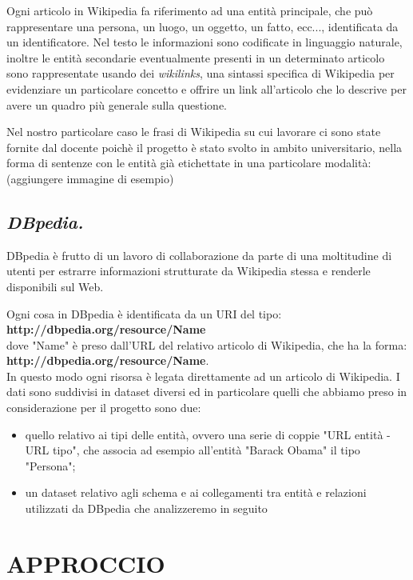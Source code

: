 \documentclass[10pt,a4paper,twocolumn]{article}
\begin{document}
Ogni articolo in Wikipedia fa riferimento ad una entità principale, che può rappresentare una persona, un luogo, un oggetto, un fatto, ecc..., identificata da un identificatore. Nel testo le informazioni sono codificate in linguaggio naturale, inoltre le entità secondarie eventualmente presenti in un determinato articolo sono rappresentate usando dei \textit{wikilinks}, una sintassi specifica di Wikipedia per evidenziare un particolare concetto e offrire un link all'articolo che lo descrive per avere un quadro più generale sulla questione.

Nel nostro particolare caso le frasi di Wikipedia su cui lavorare ci sono state fornite dal docente poichè il progetto è stato svolto in ambito universitario, nella forma di sentenze con le entità già etichettate in una particolare modalità:\\

(aggiungere immagine di esempio)

\subsection*{\textit{DBpedia.}}

DBpedia è frutto di un lavoro di collaborazione da parte di una moltitudine di utenti per estrarre informazioni strutturate da Wikipedia stessa e renderle disponibili sul Web.

Ogni cosa in DBpedia è identificata da un URI del tipo:\\\textbf{http://dbpedia.org/resource/Name}\\ dove "Name" è preso dall'URL del relativo articolo di Wikipedia, che ha la forma:\\\textbf{http://dbpedia.org/resource/Name}.\\
In questo modo ogni risorsa è legata direttamente ad un articolo di Wikipedia. I dati sono suddivisi in dataset diversi ed in particolare quelli che abbiamo preso in considerazione per il progetto sono due:
\begin{itemize}
\item quello relativo ai tipi delle entità, ovvero una serie di coppie "URL entità - URL tipo", che associa ad esempio all'entità "Barack Obama" il tipo "Persona";
\item un dataset relativo agli schema e ai collegamenti tra entità e relazioni utilizzati da DBpedia che analizzeremo in seguito
\end{itemize}

\section{APPROCCIO}
\end{document}
